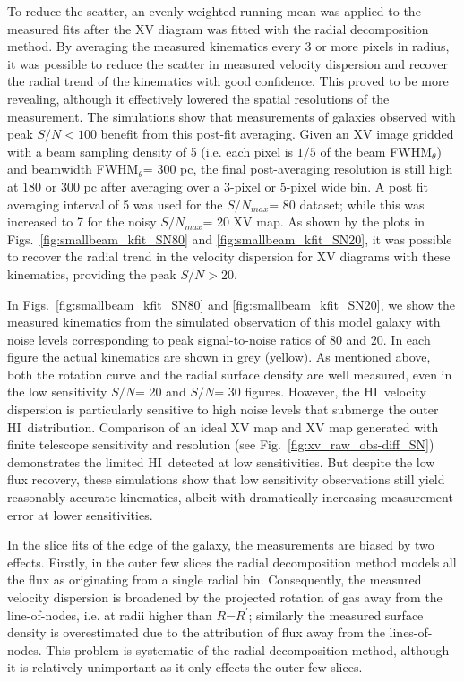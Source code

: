 \documentclass[traditabstract]{aa} %
\newcommand\HI{H{\small I}}
\begin{document}
To reduce the scatter, an evenly weighted running mean was applied to
the measured fits after the XV diagram was fitted with the radial
decomposition method. By averaging the measured kinematics every 3
or more pixels in radius, it was possible to reduce the scatter in
measured velocity dispersion and recover the radial trend of the kinematics 
with good confidence. This proved to be more revealing, although it 
effectively lowered the spatial resolutions of the measurement. The 
simulations show that measurements of galaxies observed with peak $S/N <
100$ benefit from this post-fit averaging. Given an XV image
gridded with a beam sampling density of 5 (i.e. each pixel is $1/5$ of
the beam FWHM$_{\theta}$) and beamwidth FWHM$_{\theta}$=
300 pc, the final post-averaging resolution is still high at $180$ or
$300$ pc after averaging over a $3$-pixel or $5$-pixel wide bin. A
post fit averaging interval of 5 was used for the $S/N_{max}$= 80
dataset; while this was increased to 7 for the noisy
$S/N_{max}$= 20 XV map. As shown by the plots in
Figs.~\ref{fig:smallbeam_kfit_SN80}
and \ref{fig:smallbeam_kfit_SN20}, it was possible to recover the
radial trend in the velocity dispersion for XV diagrams with these 
kinematics, providing the peak $S/N > 20$.


In Figs.~\ref{fig:smallbeam_kfit_SN80}
and \ref{fig:smallbeam_kfit_SN20}, we show the measured kinematics 
from the simulated observation of this model galaxy with noise levels 
corresponding to peak
signal-to-noise ratios of $80$  and $20$. In each figure the actual
kinematics are shown in grey (yellow).
As mentioned above, both the rotation curve and the
radial surface density are well measured, even in the low sensitivity
$S/N$= 20 and $S/N$= 30 figures. However, the \HI\ velocity dispersion is
particularly sensitive to high noise levels that submerge the outer
\HI\ distribution. Comparison of an ideal XV map and XV map generated 
with finite telescope sensitivity and resolution 
(see Fig.~\ref{fig:xv_raw_obs-diff_SN}) demonstrates the limited 
\HI\ detected at low sensitivities. But despite the low flux recovery, 
these simulations show that low sensitivity observations still yield 
reasonably accurate kinematics, albeit with dramatically increasing 
measurement error at lower sensitivities.

In the slice fits of the edge of the galaxy, the measurements are 
biased by two effects.
Firstly, in the outer few slices the radial decomposition method
models all the flux as originating from a single radial bin. 
Consequently, the measured
velocity dispersion is broadened by the projected rotation of gas
away from the line-of-nodes, i.e. at radii higher than $R$=$R^{\prime}$;
similarly the measured surface density is overestimated due to the
attribution of flux away from the lines-of-nodes. This problem is 
systematic of the radial decomposition method, although it is 
relatively unimportant
as it only effects the outer few slices.
\end{document}
